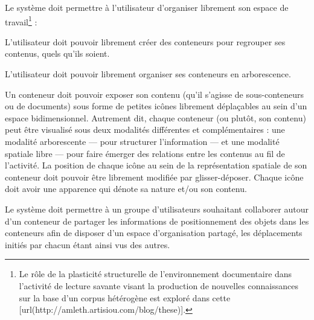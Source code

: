 \startchapter[title={Espace de travail}]

\startsection[title={Organisation et plasticité de l'espace de travail}]

\exig{}
Le système doit permettre à l'utilisateur d'organiser librement son espace de travail\footnote{Le rôle de la plasticité structurelle de l'environnement documentaire dans l'activité de lecture savante visant la production de nouvelles connaissances sur la base d'un corpus hétérogène est exploré dans cette [url(http://amleth.artisiou.com/blog/these)].} :

\startitemize
	\item
	L'utilisateur doit pouvoir librement créer des conteneurs pour regrouper ses contenus, quels qu'ils soient.
	\item
	L'utilisateur doit pouvoir librement organiser ses conteneurs en arborescence.
	\item
	Un conteneur doit pouvoir exposer son contenu (qu'il s'agisse de sous-conteneurs ou de documents) sous forme de petites icônes librement déplaçables au sein d'un espace bidimensionnel.
	Autrement dit, chaque conteneur (ou plutôt, son contenu) peut être visualisé sous deux modalités différentes et complémentaires : une modalité arborescente --- pour structurer l'information --- et une modalité spatiale libre --- pour faire émerger des relations entre les contenus au fil de l'activité.
	La position de chaque icône au sein de la représentation spatiale de son conteneur doit pouvoir être librement modifiée par glisser-déposer.
	Chaque icône doit avoir une apparence qui dénote sa nature et/ou son contenu.
\stopitemize

\exig{}
Le système doit permettre à un groupe d'utilisateurs souhaitant collaborer autour d'un conteneur de partager les informations de positionnement des objets dans les conteneurs afin de disposer d'un espace d'organisation partagé, les déplacements initiés par chacun étant ainsi vus des autres.

\startsection[title={Éléments de modélisation}]

